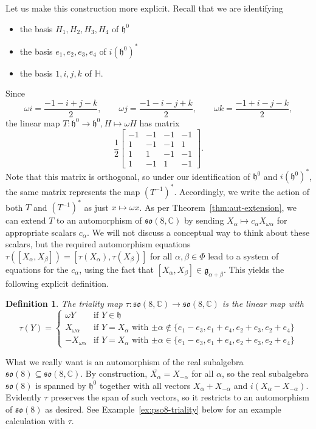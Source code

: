 \documentclass[reqno]{amsart}
\newtheorem{definition}[theorem]{Definition}
\theoremstyle{definition} \newtheorem{example}[theorem]{Example}
\newcommand{\CC}{\mathbb{C}}
\newcommand{\HH}{\mathbb{H}}
\newcommand{\so}{\mathfrak{so}}
\newcommand{\g}{\mathfrak{g}}
\newcommand{\h}{\mathfrak{h}}
\begin{document}
Let us make this construction more explicit. Recall that we are identifying
\begin{itemize}
\item the basis $H_1, H_2,H_3,H_4$ of $\h^0$
\item the basis $e_1,e_2,e_3,e_4$ of $i(\h^0)^*$
\item the basis $1,i,j,k$ of $\HH$.
\end{itemize}
Since
\begin{equation*}
\omega i = \frac{-1-i+j-k}{2}, \qquad \omega j = \frac{-1-i-j+k}{2}, \qquad \omega k = \frac{-1+i-j-k}{2},
\end{equation*}
the linear map $T : \h^0 \to \h^0, H \mapsto \omega H$ has matrix
\begin{equation} \label{eq:triality-matrix-h}
 \frac{1}{2} \begin{bmatrix}
-1 & -1 & -1 & -1\\
1 & -1 & -1 & 1\\
1 & 1 & -1 & -1\\
1 & -1 & 1 & -1
\end{bmatrix}.
\end{equation}
Note that this matrix is orthogonal, so under our identification of $\h^0$ and $i(\h^0)^*$, the same matrix represents the map $(T^{-1})^*$.  Accordingly, we write the action of both $T$ and $(T^{-1})^*$ as just $x \mapsto \omega x$. As per Theorem~\ref{thm:aut-extension},  we can extend $T$ to an automorphism of $\so(8,\CC)$ by sending $X_\alpha \mapsto c_\alpha X_{\omega \alpha}$ for appropriate scalars $c_\alpha$. We will not discuss a conceptual way to think about these scalars, but the required automorphism equations $\tau([X_{\alpha},X_{\beta}]) = [\tau(X_{\alpha}), \tau(X_{\beta})]$ for all $\alpha,\beta \in \Phi$ lead to a system of equations for the $c_{\alpha}$, using the fact that $[X_{\alpha}, X_{\beta}] \in \g_{\alpha+\beta}$. This yields the following explicit definition.

\begin{definition} \label{def:pso8-triality}
The \emph{triality map} $\tau : \so(8,\CC) \to \so(8,\CC)$ is the linear map with
\begin{equation*}
\tau(Y) = \begin{cases}
\omega Y & \text{if $Y \in \h$}\\
X_{\omega \alpha} & \text{if $Y = X_{\alpha}$ with $\pm \alpha \notin \{e_1-e_3, e_1+e_4, e_2+e_3,e_2+e_4\}$}\\
-X_{\omega \alpha} & \text{if $Y = X_{\alpha}$ with $\pm \alpha \in \{e_1-e_3, e_1+e_4, e_2+e_3,e_2+e_4\}$}
\end{cases}
\end{equation*}
\end{definition}
What we really want is an automorphism of the real subalgebra $\so(8) \subseteq \so(8,\CC)$. By construction, $\overline{X_\alpha} = X_{-\alpha}$ for all $\alpha$, so the real subalgebra $\so(8)$ is spanned by $\h^0$ together with all vectors $X_{\alpha}+X_{-\alpha}$ and $i(X_{\alpha}-X_{-\alpha})$. Evidently $\tau$ preserves the span of such vectors, so it restricts to an automorphism of $\so(8)$ as desired. See Example~\ref{ex:pso8-triality} below for an example calculation with $\tau$.
\end{document}
